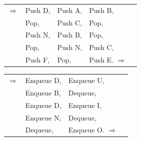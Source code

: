 \documentclass[11pt,a4paper]{article}
\begin{document}
\begin{center}
\begin{table}[ht!]
  \centering
  \begin{minipage}{0.45\textwidth}


\begin{center}
\begin{tabular}{c L{2cm} L{2cm} L{2cm} c }
$\Rightarrow$ & Push D, & Push A, & Push B,  & \phantom{Iq} \\
& Pop,    & Push C, & Pop,     & \phantom{Iq} \\
& Push N, & Push B, & Pop,     & \phantom{Iq} \\
& Pop,    & Push N, & Push C,  & \phantom{Iq} \\
& Push F, & Pop,    & Push E. $\Rightarrow$ & \phantom{Iq} \\
\end{tabular}
\end{center}

  \end{minipage}
  \hfillx
  \begin{minipage}{0.01\textwidth}


  \end{minipage}
  \hfillx
  \begin{minipage}{0.45\textwidth}


\begin{center}
\begin{tabular}{c L{2.5cm} L{2.5cm} c }
$\Rightarrow$
& Enqueue D, & Enqueue U,  & \phantom{Iq} \\
& Enqueue B, & Dequeue,    & \phantom{Iq} \\
& Enqueue D, & Enqueue I,  & \phantom{Iq} \\
& Enqueue N, & Dequeue,    & \phantom{Iq} \\
& Dequeue,   & Enqueue O. $\Rightarrow$ & \phantom{Iq} \\
\end{tabular}
\end{center}

  \end{minipage}
\end{table}
\end{center}
\end{document}
